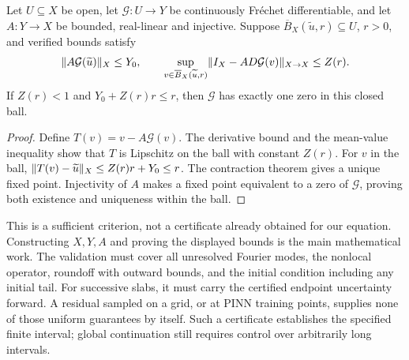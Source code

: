 \begin{theorem}
\label{thm:certificate}
Let $U\subseteq X$ be open, let $\mathcal G:U\to Y$ be continuously
Fr\'echet differentiable, and let $A:Y\to X$ be bounded, real-linear and
injective. Suppose $\overline B_X(\widetilde u,r)\subseteq U$, $r>0$, and
verified bounds satisfy
\[
 \lVert A\mathcal G(\widetilde u)\rVert_X\leq Y_0,\qquad
 \sup_{v\in\overline B_X(\widetilde u,r)}
 \lVert I_X-A D\mathcal G(v)\rVert_{X\to X}\leq Z(r).
\]
If $Z(r)<1$ and $Y_0+Z(r)r\leq r$, then $\mathcal G$ has exactly one zero
in this closed ball.
\end{theorem}
\begin{proof}
Define $T(v)=v-A\mathcal G(v)$. The derivative bound and the mean-value
inequality show that $T$ is Lipschitz on the ball with constant $Z(r)$.
For $v$ in the ball,
$\lVert T(v)-\widetilde u\rVert_X\leq Z(r)r+Y_0\leq r$.
The contraction theorem gives a unique fixed point. Injectivity of $A$
makes a fixed point equivalent to a zero of $\mathcal G$, proving both
existence and uniqueness within the ball.
\end{proof}

This is a sufficient criterion, not a certificate already obtained for
our equation. Constructing $X,Y,A$ and proving the displayed bounds is the
main mathematical work. The validation must cover all unresolved Fourier
modes, the nonlocal operator, roundoff with outward bounds, and the initial
condition including any initial tail. For successive slabs, it must carry
the certified endpoint uncertainty forward. A residual sampled on a grid,
or at PINN training points, supplies none of those uniform guarantees by
itself. Such a certificate establishes the specified finite interval;
global continuation still requires control over arbitrarily long intervals.
